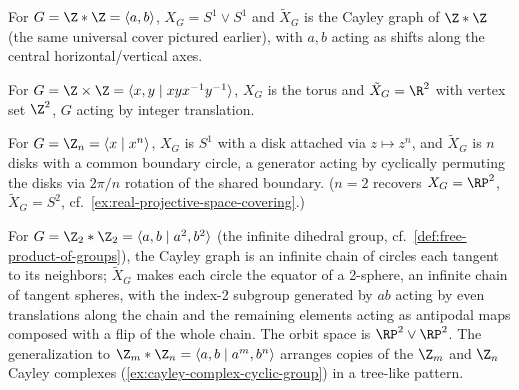 \begin{example}
\label{ex:cayley-graph-free-group}
For $G=\Z*\Z=\langle a,b\rangle$, $X_G = S^1\vee S^1$ and $\tilde X_G$ is the Cayley
graph of $\Z*\Z$ (the same universal cover pictured earlier), with $a,b$ acting as
shifts along the central horizontal/vertical axes.
\end{example}

\begin{example}
\label{ex:cayley-complex-torus}
For $G=\Z\times\Z=\langle x,y\mid xyx^{-1}y^{-1}\rangle$, $X_G$ is the torus and
$\tilde X_G = \R^2$ with vertex set $\Z^2$, $G$ acting by integer translation.
\end{example}

\begin{example}
\label{ex:cayley-complex-cyclic-group}
For $G=\Z_n=\langle x\mid x^n\rangle$, $X_G$ is $S^1$ with a disk attached via
$z\mapsto z^n$, and $\tilde X_G$ is $n$ disks with a common boundary circle, a
generator acting by cyclically permuting the disks via $2\pi/n$ rotation of the shared
boundary. ($n=2$ recovers $X_G=\RP^2$, $\tilde X_G=S^2$, cf.\
\cref{ex:real-projective-space-covering}.)
\end{example}

\begin{example}
\label{ex:cayley-complex-infinite-dihedral}
For $G=\Z_2*\Z_2=\langle a,b\mid a^2,b^2\rangle$ (the infinite dihedral group, cf.\
\cref{def:free-product-of-groups}), the Cayley graph is an infinite chain of circles each
tangent to its neighbors; $\tilde X_G$ makes each circle the equator of a 2-sphere, an
infinite chain of tangent spheres, with the index-2 subgroup generated by $ab$
acting by even translations along the chain and the remaining elements acting as
antipodal maps composed with a flip of the whole chain. The orbit space is
$\RP^2\vee\RP^2$. The generalization to $\Z_m*\Z_n=\langle a,b\mid a^m,b^n\rangle$
arranges copies of the $\Z_m$ and $\Z_n$ Cayley complexes
(\cref{ex:cayley-complex-cyclic-group}) in a tree-like pattern.


\end{example}

